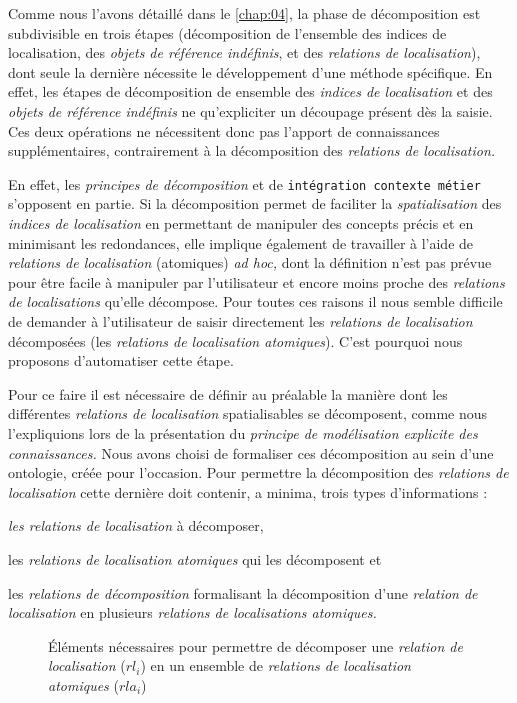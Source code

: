 Comme nous l'avons détaillé dans le \autoref{chap:04}, la phase de
décomposition est subdivisible en trois étapes (décomposition de
l'ensemble des indices de localisation, des \emph{objets de référence
  indéfinis}, et des \emph{relations de localisation}), dont seule la
dernière nécessite le développement d'une méthode spécifique. En
effet, les étapes de décomposition de ensemble des \emph{indices de
  localisation} et des \emph{objets de référence indéfinis} ne
qu'expliciter un découpage présent dès la saisie. Ces deux opérations
ne nécessitent donc pas l'apport de connaissances supplémentaires,
contrairement à la décomposition des \emph{relations de localisation.}

En effet, les \emph{principes de décomposition} et de
\texttt{intégration contexte métier} s'opposent en partie. Si la
décomposition permet de faciliter la \emph{spatialisation} des
\emph{indices de localisation} en permettant de manipuler des concepts
précis et en minimisant les redondances, elle implique également de
travailler à l'aide de \emph{relations de localisation} (atomiques)
\emph{ad hoc,} dont la définition n'est pas prévue pour être facile à
manipuler par l'utilisateur et encore moins proche des \emph{relations
  de localisations} qu'elle décompose. Pour toutes ces raisons il nous
semble difficile de demander à l'utilisateur de saisir directement les
\emph{relations de localisation} décomposées (\ie les \emph{relations
  de localisation atomiques}). C'est pourquoi nous proposons
d'automatiser cette étape.

Pour ce faire il est nécessaire de définir au préalable la manière
dont les différentes \emph{relations de localisation} spatialisables
se décomposent, comme nous l'expliquions lors de la présentation du
\emph{principe de modélisation explicite des connaissances.} Nous
avons choisi de formaliser ces décomposition au sein d'une ontologie,
créée pour l'occasion. Pour permettre la décomposition des \emph{relations
de localisation} cette dernière doit contenir, a minima, trois types
d'informations :
%
\begin{enumerate*}[label=(\alph*)]
\item \emph{les relations de localisation} à décomposer,
\item les \emph{relations de localisation atomiques} qui les
  décomposent et
\item les \emph{relations de décomposition} formalisant la
  décomposition d'une \emph{relation de localisation} en plusieurs
  \emph{relations de localisations atomiques.}
\end{enumerate*}

\begin{figure}
  \centering
   
  \caption{Éléments nécessaires pour permettre de décomposer une
    \emph{relation de localisation} ($rl_i$) en un ensemble de
    \emph{relations de localisation atomiques} ($rla_i$)}
  \label{fig:onto_min_struct}
\end{figure}



